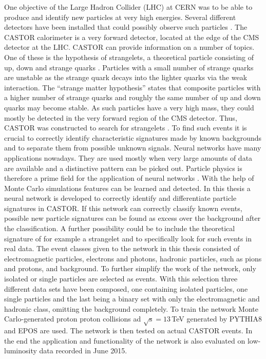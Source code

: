 One objective of the Large Hadron Collider (LHC) at CERN was to be able to produce and identify new particles at very high energies. Several different detectors have been installed that could possibly observe such particles \cite{atlas} \cite{cmscollab}.
The CASTOR calorimeter is a very forward detector, located at the edge of the CMS detector at the LHC. CASTOR can provide information on a number of topics. One of these is the hypothesis of strangelets, a theoretical particle consisting of up, down and strange quarks \cite{strangelet}. Particles with a small number of strange quarks are unstable as the strange quark decays into the lighter quarks via the weak interaction. The \enquote{strange matter hypothesis} states that composite particles with a higher number of strange quarks and roughly the same number of up and down quarks may become stable. As such particles have a very high mass, they could mostly be detected in the very forward region of the CMS detector. Thus, CASTOR was constructed to search for strangelets \cite{strangeletcastor}. To find such events it is crucial to correctly identify characteristic signatures made by known backgrounds and to separate them from possible unknown signals. \newline
Neural networks have many applications nowadays. They are used mostly when very large amounts of data are available and a distinctive pattern can be picked out. Particle physics is therefore a prime field for the application of neural networks \cite{dnnparticle1}\cite{dnnparticle2}\cite{dnnparticle3}. With the help of Monte Carlo simulations features can be learned and detected. In this thesis a neural network is developed to correctly identify and differentiate particle signatures in CASTOR. If this network can correctly classify known events, possible new particle signatures can be found as excess over the background after the classification. A further possibility could be to include the theoretical signature of for example a strangelet and to specifically look for such events in real data. \newline
The event classes given to the network in this thesis consisted of electromagnetic particles, electrons and photons, hadronic particles, such as pions and protons, and background. To further simplify the work of the network, only isolated or single particles are selected as events. With this selection three different data sets have been composed, one containing isolated particles, one single particles and the last being a binary set with only the electromagnetic and hadronic class, omitting the background completely. To train the network Monte Carlo-generated proton proton collisions ad $\sqrt{\mathrm{s}} = 13 \,$TeV generated by PYTHIA8 and EPOS are used. The network is then tested on actual CASTOR events. In the end the application and functionality of the network is also evaluated on low-luminosity data recorded in June 2015. 